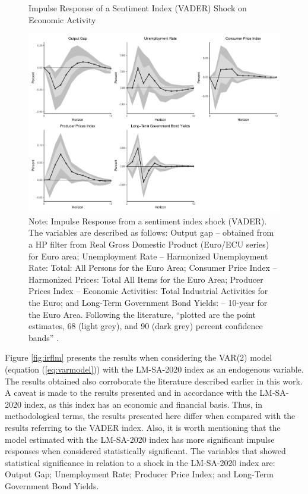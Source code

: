 \begin{figure}[!h]
    \centering
    \caption{Impulse Response of a Sentiment Index (VADER) Shock on Economic Activity}
    \includegraphics[width=\textwidth]{images/irf_vader.pdf}
    \caption*{Note: Impulse Response from a sentiment index shock (VADER). The variables are described as follows: Output gap -- obtained from a HP filter from Real Gross Domestic Product (Euro/ECU series) for Euro area; Unemployment Rate -- Harmonized Unemployment Rate: Total: All Persons for the Euro Area; Consumer Price Index -- Harmonized Prices: Total All Items for the Euro Area; Producer Prices Index -- Economic Activities: Total Industrial Activities for the Euro; and Long-Term Government Bond Yields: -- 10-year for the Euro Area. Following the literature, ``plotted are the point estimates, 68 (light grey), and 90 (dark grey) percent confidence bands'' \cite[p. 40]{shapiro2020measuring}.}
    \label{fig:irfvader}
\end{figure}

Figure \ref{fig:irflm} presents the results when considering the VAR(2) model (equation (\ref{eq:varmodel})) with the LM-SA-2020 index as an endogenous variable. The results obtained also corroborate the literature described earlier in this work.\\

A caveat is made to the results presented and in accordance with the LM-SA-2020 index, as this index has an economic and financial basis. Thus, in methodological terms, the results presented here differ when compared with the results referring to the VADER index. Also, it is worth mentioning that the model estimated with the LM-SA-2020 index has more significant impulse responses when considered statistically significant. The variables that showed statistical significance in relation to a shock in the LM-SA-2020 index are: Output Gap; Unemployment Rate; Producer Price Index; and Long-Term Government Bond Yields.\\


